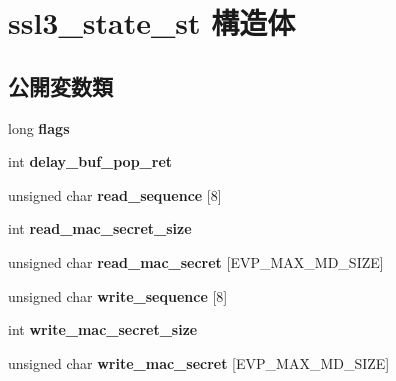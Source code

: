 \hypertarget{structssl3__state__st}{}\section{ssl3\+\_\+state\+\_\+st 構造体}
\label{structssl3__state__st}
\subsection*{公開変数類}
\begin{DoxyCompactItemize}
\item 
\hypertarget{structssl3__state__st_a8565ca9c9bebf7a771a99ef035ff6503}{}long {\bfseries flags}\label{structssl3__state__st_a8565ca9c9bebf7a771a99ef035ff6503}

\item 
\hypertarget{structssl3__state__st_a27a3b6185c010f82d22bfcd7feb5a43f}{}int {\bfseries delay\+\_\+buf\+\_\+pop\+\_\+ret}\label{structssl3__state__st_a27a3b6185c010f82d22bfcd7feb5a43f}

\item 
\hypertarget{structssl3__state__st_a0d46ad2e211a7ba8fb712e66cf451d31}{}unsigned char {\bfseries read\+\_\+sequence} \mbox{[}8\mbox{]}\label{structssl3__state__st_a0d46ad2e211a7ba8fb712e66cf451d31}

\item 
\hypertarget{structssl3__state__st_a5f9e172ca1b931c4bb0bb44e80898d15}{}int {\bfseries read\+\_\+mac\+\_\+secret\+\_\+size}\label{structssl3__state__st_a5f9e172ca1b931c4bb0bb44e80898d15}

\item 
\hypertarget{structssl3__state__st_a650dfa61b083a05fafa16b3c62d6fe69}{}unsigned char {\bfseries read\+\_\+mac\+\_\+secret} \mbox{[}E\+V\+P\+\_\+\+M\+A\+X\+\_\+\+M\+D\+\_\+\+S\+I\+Z\+E\mbox{]}\label{structssl3__state__st_a650dfa61b083a05fafa16b3c62d6fe69}

\item 
\hypertarget{structssl3__state__st_a0ce6af56e080899190f33ebf954979ff}{}unsigned char {\bfseries write\+\_\+sequence} \mbox{[}8\mbox{]}\label{structssl3__state__st_a0ce6af56e080899190f33ebf954979ff}

\item 
\hypertarget{structssl3__state__st_a916b1cd43d422b48e52b779e79432b5c}{}int {\bfseries write\+\_\+mac\+\_\+secret\+\_\+size}\label{structssl3__state__st_a916b1cd43d422b48e52b779e79432b5c}

\item 
\hypertarget{structssl3__state__st_a2b686268d62c7756883eea3d9f77926a}{}unsigned char {\bfseries write\+\_\+mac\+\_\+secret} \mbox{[}E\+V\+P\+\_\+\+M\+A\+X\+\_\+\+M\+D\+\_\+\+S\+I\+Z\+E\mbox{]}\label{structssl3__state__st_a2b686268d62c7756883eea3d9f77926a}


\end{DoxyCompactItemize}
